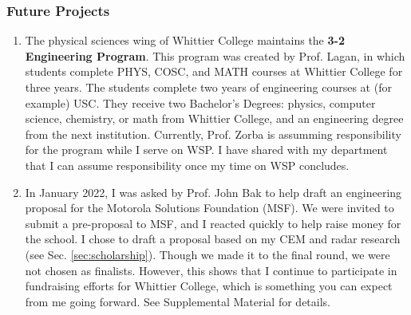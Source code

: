 \documentclass[../../../main.tex]{subfiles}
\begin{document}
\subsubsection{Future Projects}
\small
\begin{enumerate}
\item The physical sciences wing of Whittier College maintains the \textbf{3-2 Engineering Program}.  This program was created by Prof. Lagan, in which students complete PHYS, COSC, and MATH courses at Whittier College for three years.  The students complete two years of engineering courses at (for example) USC.  They receive two Bachelor's Degrees: physics, computer science, chemistry, or math from Whittier College, and an engineering degree from the next institution.  Currently, Prof. Zorba is assumming responsibility for the program while I serve on WSP.  I have shared with my department that I can assume responsibility once my time on WSP concludes.
\item In January 2022, I was asked by Prof. John Bak to help draft an engineering proposal for the Motorola Solutions Foundation (MSF).  We were invited to submit a pre-proposal to MSF, and I reacted quickly to help raise money for the school.  I chose to draft a proposal based on my CEM and radar research (see Sec. \ref{sec:scholarship}).  Though we made it to the final round, we were not chosen as finalists.  However, this shows that I continue to participate in fundraising efforts for Whittier College, which is something you can expect from me going forward.  See Supplemental Material for details.
\end{enumerate}
\end{document}
